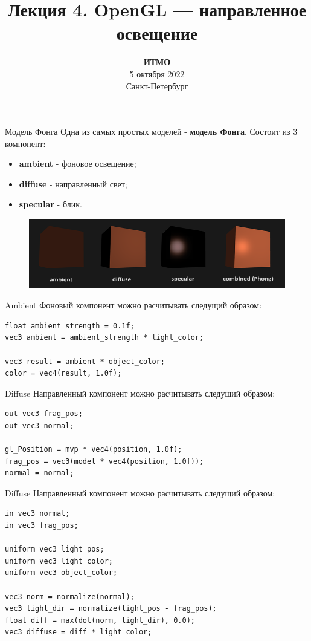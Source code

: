 \documentclass[aspectration=1610,t]{beamer}
\title{Лекция 4. OpenGL --- направленное освещение}
\date{
   \textbf{ИТМО}\\
   5 октября 2022\\
   Санкт-Петербург
}
\begin{document}
\begin{frame}
  \titlepage
\end{frame}

\begin{frame}[fragile]{Модель Фонга}
    Одна из самых простых моделей - {\bf модель Фонга}. Состоит из 3 компонент:
    \begin{itemize}
        \item {\bf ambient} - фоновое освещение;
        \item {\bf diffuse} - направленный свет;
        \item {\bf specular} - блик.
    \end{itemize}
    \begin{figure}[htp]
        \centering
        \includegraphics[scale=0.40]{res/phong}
    \end{figure}
\end{frame}

\begin{frame}[fragile]{Ambient}
    Фоновый компонент можно расчитывать следущий образом:
            {\small \begin{lstlisting}
float ambient_strength = 0.1f;
vec3 ambient = ambient_strength * light_color;

vec3 result = ambient * object_color;
color = vec4(result, 1.0f);
            \end{lstlisting}}
\end{frame}

\begin{frame}[fragile]{Diffuse}
    Направленный компонент можно расчитывать следущий образом:
            {\small \begin{lstlisting}
out vec3 frag_pos;  
out vec3 normal;

gl_Position = mvp * vec4(position, 1.0f);
frag_pos = vec3(model * vec4(position, 1.0f));
normal = normal;
            \end{lstlisting}}
\end{frame}

\begin{frame}[fragile]{Diffuse}
    Направленный компонент можно расчитывать следущий образом:
            {\small \begin{lstlisting}
in vec3 normal;  
in vec3 frag_pos;  
    
uniform vec3 light_pos; 
uniform vec3 light_color;
uniform vec3 object_color;

vec3 norm = normalize(normal);
vec3 light_dir = normalize(light_pos - frag_pos);
float diff = max(dot(norm, light_dir), 0.0);
vec3 diffuse = diff * light_color;
            \end{lstlisting}}
\end{frame}
\end{document}
